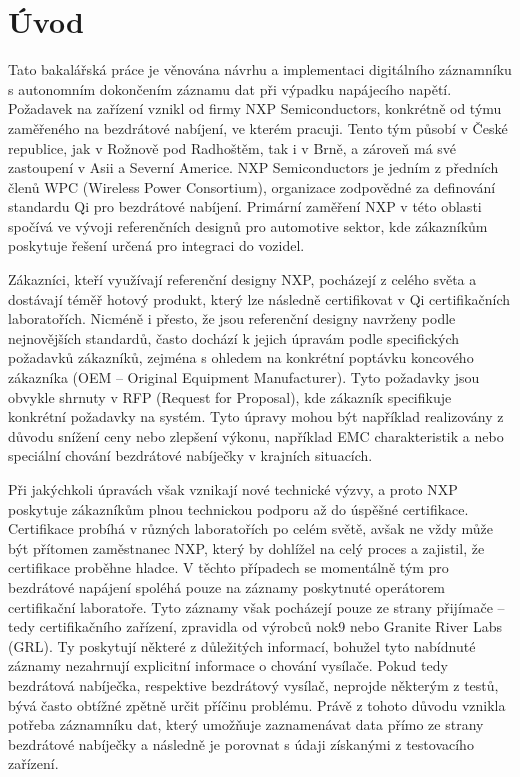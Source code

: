 
%

\chapter{Úvod}
\label{uvod}
Tato bakalářská práce je věnována návrhu a implementaci digitálního záznamníku s autonomním dokončením záznamu dat při výpadku napájecího napětí. Požadavek na zařízení vznikl od firmy NXP Semiconductors, konkrétně od týmu zaměřeného na bezdrátové nabíjení, ve kterém pracuji. Tento tým působí v České republice, jak v Rožnově pod Radhoštěm, tak i v Brně, a zároveň má své zastoupení v Asii a Severní Americe. NXP Semiconductors je jedním z předních členů WPC (Wireless Power Consortium), organizace zodpovědné za definování standardu Qi pro bezdrátové nabíjení. Primární zaměření NXP v této oblasti spočívá ve vývoji referenčních designů pro automotive sektor, kde zákazníkům poskytuje řešení určená pro integraci do vozidel.

Zákazníci, kteří využívají referenční designy NXP, pocházejí z celého světa a dostávají téměř hotový produkt, který lze následně certifikovat v Qi certifikačních laboratořích. Nicméně i přesto, že jsou referenční designy navrženy podle nejnovějších standardů, často dochází k jejich úpravám podle specifických požadavků zákazníků, zejména s ohledem na konkrétní poptávku koncového zákazníka (OEM – Original Equipment Manufacturer). Tyto požadavky jsou obvykle shrnuty v RFP (Request for Proposal), kde zákazník specifikuje konkrétní požadavky na systém. Tyto úpravy mohou být například realizovány z důvodu snížení ceny nebo zlepšení výkonu, například EMC charakteristik a nebo speciální chování bezdrátové nabíječky v krajních situacích. 

Při jakýchkoli úpravách však vznikají nové technické výzvy, a proto NXP poskytuje zákazníkům plnou technickou podporu až do úspěšné certifikace. Certifikace probíhá v různých laboratořích po celém světě, avšak ne vždy může být přítomen zaměstnanec NXP, který by dohlížel na celý proces a zajistil, že certifikace proběhne hladce. V těchto případech se momentálně tým pro bezdrátové napájení spoléhá pouze na záznamy poskytnuté operátorem certifikační laboratoře. Tyto záznamy však pocházejí pouze ze strany přijímače – tedy certifikačního zařízení, zpravidla od výrobců nok9 nebo Granite River Labs (GRL). Ty poskytují některé z důležitých informací, bohužel tyto nabídnuté záznamy nezahrnují explicitní informace o chování vysílače. Pokud tedy bezdrátová nabíječka, respektive bezdrátový vysílač, neprojde některým z testů, bývá často obtížné zpětně určit příčinu problému. Právě z tohoto důvodu vznikla potřeba záznamníku dat, který umožňuje zaznamenávat data přímo ze strany bezdrátové nabíječky a následně je porovnat s údaji získanými z testovacího zařízení. \cite{nxp_wireless_charging_team}

